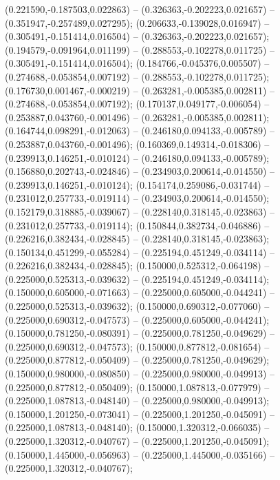  (0.221590,-0.187503,0.022863) -- (0.326363,-0.202223,0.021657) -- (0.351947,-0.257489,0.027295);
 (0.206633,-0.139028,0.016947) -- (0.305491,-0.151414,0.016504) -- (0.326363,-0.202223,0.021657);
 (0.194579,-0.091964,0.011199) -- (0.288553,-0.102278,0.011725) -- (0.305491,-0.151414,0.016504);
 (0.184766,-0.045376,0.005507) -- (0.274688,-0.053854,0.007192) -- (0.288553,-0.102278,0.011725);
 (0.176730,0.001467,-0.000219) -- (0.263281,-0.005385,0.002811) -- (0.274688,-0.053854,0.007192);
 (0.170137,0.049177,-0.006054) -- (0.253887,0.043760,-0.001496) -- (0.263281,-0.005385,0.002811);
 (0.164744,0.098291,-0.012063) -- (0.246180,0.094133,-0.005789) -- (0.253887,0.043760,-0.001496);
 (0.160369,0.149314,-0.018306) -- (0.239913,0.146251,-0.010124) -- (0.246180,0.094133,-0.005789);
 (0.156880,0.202743,-0.024846) -- (0.234903,0.200614,-0.014550) -- (0.239913,0.146251,-0.010124);
 (0.154174,0.259086,-0.031744) -- (0.231012,0.257733,-0.019114) -- (0.234903,0.200614,-0.014550);
 (0.152179,0.318885,-0.039067) -- (0.228140,0.318145,-0.023863) -- (0.231012,0.257733,-0.019114);
 (0.150844,0.382734,-0.046886) -- (0.226216,0.382434,-0.028845) -- (0.228140,0.318145,-0.023863);
 (0.150134,0.451299,-0.055284) -- (0.225194,0.451249,-0.034114) -- (0.226216,0.382434,-0.028845);
 (0.150000,0.525312,-0.064198) -- (0.225000,0.525313,-0.039632) -- (0.225194,0.451249,-0.034114);
 (0.150000,0.605000,-0.071663) -- (0.225000,0.605000,-0.044241) -- (0.225000,0.525313,-0.039632);
 (0.150000,0.690312,-0.077060) -- (0.225000,0.690312,-0.047573) -- (0.225000,0.605000,-0.044241);
 (0.150000,0.781250,-0.080391) -- (0.225000,0.781250,-0.049629) -- (0.225000,0.690312,-0.047573);
 (0.150000,0.877812,-0.081654) -- (0.225000,0.877812,-0.050409) -- (0.225000,0.781250,-0.049629);
 (0.150000,0.980000,-0.080850) -- (0.225000,0.980000,-0.049913) -- (0.225000,0.877812,-0.050409);
 (0.150000,1.087813,-0.077979) -- (0.225000,1.087813,-0.048140) -- (0.225000,0.980000,-0.049913);
 (0.150000,1.201250,-0.073041) -- (0.225000,1.201250,-0.045091) -- (0.225000,1.087813,-0.048140);
 (0.150000,1.320312,-0.066035) -- (0.225000,1.320312,-0.040767) -- (0.225000,1.201250,-0.045091);
 (0.150000,1.445000,-0.056963) -- (0.225000,1.445000,-0.035166) -- (0.225000,1.320312,-0.040767);

